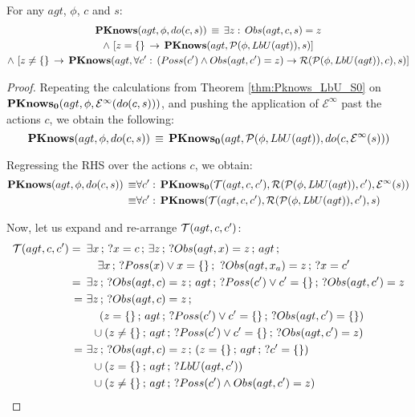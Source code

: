 \begin{thmext}
[{\ref{thm:Pknows_LbU_do}}] For any $agt$, $\phi$, $c$ and $s$:\begin{multline*}
\mathbf{PKnows}(agt,\phi,do(c,s))\,\equiv\,\exists z:\, Obs(agt,c,s)=z\\
\wedge\,\left[z=\{\}\,\rightarrow\,\mathbf{PKnows}(agt,\mathcal{P}(\phi,LbU(agt)),s)\right]\\
\wedge\,\left[z\neq\{\}\,\rightarrow\,\mathbf{PKnows}(agt,\forall c':\,\left(Poss(c')\wedge Obs(agt,c')=z\right)\rightarrow\mathcal{R}(\mathcal{P}(\phi,LbU(agt)),c),s)\right]\end{multline*}

\end{thmext}
\begin{proof}
Repeating the calculations from Theorem \ref{thm:Pknows_LbU_S0} on
$\mathbf{PKnows_{0}}(agt,\phi,\mathcal{E}^{\infty}(do(c,s)))$, and pushing the
application of $\mathcal{E}^{\infty}$ past the actions $c$, we obtain
the following:\[
\mathbf{PKnows}(agt,\phi,do(c,s))\,\equiv\,\mathbf{PKnows_{0}}(agt,\mathcal{P}(\phi,LbU(agt)),do(c,\mathcal{E}^{\infty}(s)))\]


Regressing the RHS over the actions $c$, we obtain:\begin{align*}
\mathbf{PKnows}(agt,\phi,do(c,s))\,\equiv & \forall c':\,\mathbf{PKnows_{0}}(\mathcal{T}(agt,c,c'),\mathcal{R}(\mathcal{P}(\phi,LbU(agt)),c'),\mathcal{E}^{\infty}(s))\\
\equiv & \forall c':\,\mathbf{PKnows}(\mathcal{T}(agt,c,c'),\mathcal{R}(\mathcal{P}(\phi,LbU(agt)),c'),s)\end{align*}


Now, let us expand and re-arrange $\mathcal{T}(agt,c,c')$:\begin{align*}
\mathcal{T}(agt,c,c')=\,\,\, & \exists x\,;\,?x=c\,;\,\exists z\,;\,?Obs(agt,x)=z\,;\, agt\,;\\
 & \,\,\,\,\,\,\exists x\,;\,?Poss(x)\vee x=\{\}\,;\,\,?Obs(agt,x_{a})=z\,;\,?x=c'\\
=\,\,\, & \exists z\,;\,?Obs(agt,c)=z\,;\, agt\,;\,?Poss(c')\vee c'=\{\}\,;\,?Obs(agt,c')=z\\
=\,\, & \exists z\,;\,?Obs(agt,c)=z\,;\\
 & \,\,\,\,\,\,\left(z=\{\}\,;\, agt\,;\,?Poss(c')\vee c'=\{\}\,;\,?Obs(agt,c')=\{\}\right)\\
 & \,\,\,\cup\left(z\neq\{\}\,;\, agt\,;\,?Poss(c')\vee c'=\{\}\,;\,?Obs(agt,c')=z\right)\\
=\,\, & \exists z\,;\,?Obs(agt,c)=z\,;\,\left(z=\{\}\,;\, agt\,;\,?c'=\{\}\right)\\
 & \,\,\,\cup\left(z=\{\}\,;\, agt\,;\,?LbU(agt,c')\right)\\
 & \,\,\,\cup\left(z\neq\{\}\,;\, agt\,;\,?Poss(c')\wedge Obs(agt,c')=z\right)\end{align*}



\end{proof}
